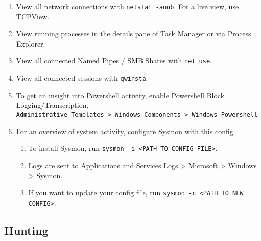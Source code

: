 \documentclass[12pt,letterpaper]{article}
\def\code#1{\textcolor{c2}{\texttt{#1}}}
\begin{document}
\begin{enumerate}
	\item View all network connections with \code{netstat -aonb}. For a live view, use TCPView.
	\item View running processes in the details pane of Task Manager or via Process Explorer.
	\item View all connected Named Pipes / SMB Shares with \code{net use}.
	\item View all connected sessions with \code{qwinsta}.
	\item To get an insight into Powershell activity, enable Powershell Block Logging/Transcription. \\
		\code{Administrative Templates > Windows Components > Windows Powershell}
	\item For an overview of system activity, configure Sysmon with \href{https://github.com/D42H5/cyber_comp_resources/blob/main/sysmonconfig-export-modified-2-2-24.xml}{this config}.
	\begin{enumerate}
		\item To install Sysmon, run \code{sysmon -i <PATH TO CONFIG FILE>}.
		\item Logs are sent to Applications and Services Logs > Microsoft > Windows > Sysmon.
		\item If you want to update your config file, run \code{sysmon -c <PATH TO NEW CONFIG>}. 
	\end{enumerate}
\end{enumerate}

\subsection{Hunting}
\end{document}
